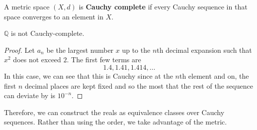   \begin{definition}
    A metric space $(X, d)$ is \textbf{Cauchy complete} if every Cauchy sequence in that space converges to an element in $X$. 
  \end{definition} 

  \begin{theorem}
    $\mathbb{Q}$ is not Cauchy-complete. 
  \end{theorem}
  \begin{proof}
    Let $a_n$ be the largest number $x$ up to the $n$th decimal expansion such that $x^2$ does not exceed $2$. The first few terms are 
    \begin{equation}
      1.4, 1.41, 1.414, \ldots
    \end{equation}
    In this case, we can see that this is Cauchy since at the $n$th element and on, the first $n$ decimal places are kept fixed and so the most that the rest of the sequence can deviate by is $10^{-n}$. 
  \end{proof}

  Therefore, we can construct the reals as equivalence classes over Cauchy sequences. Rather than using the order, we take advantage of the metric. 

